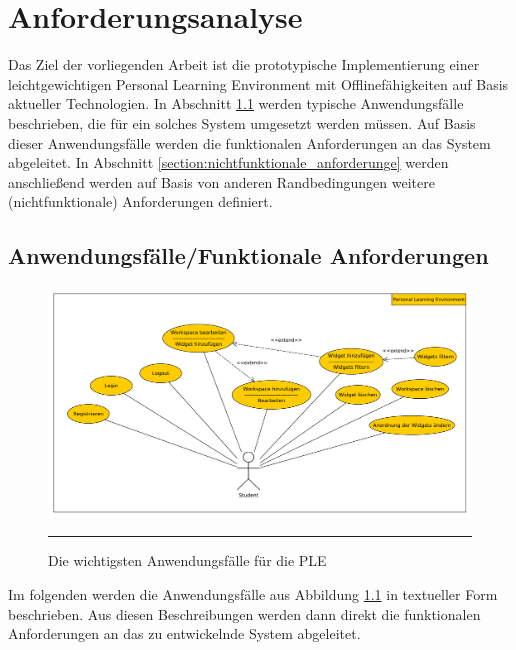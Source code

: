 \chapter{Anforderungsanalyse} 
\label{chapter:Kapitel3}

Das Ziel der vorliegenden Arbeit ist die prototypische Implementierung einer leichtgewichtigen Personal Learning Environment mit Offlinefähigkeiten auf Basis aktueller Technologien. In Abschnitt \ref{section:anwendungsfaelle} werden typische Anwendungsfälle beschrieben, die für ein solches System umgesetzt werden müssen. Auf Basis dieser Anwendungsfälle werden die funktionalen Anforderungen an das System abgeleitet. In Abschnitt \ref{section:nichtfunktionale_anforderunge} werden anschließend werden auf Basis von anderen Randbedingungen weitere (nichtfunktionale) Anforderungen definiert.

\section{Anwendungsfälle/Funktionale Anforderungen}\label{section:anwendungsfaelle}
\begin{figure}[hb]
  \centering
  \includegraphics[width=\textwidth,height=\textheight,keepaspectratio]{./Figures/anwendungsfaelle_quer.pdf}
    \rule{35em}{0.5pt}
  \caption[Anwendungsfälle der PLE]{Die wichtigsten Anwendungsfälle für die PLE}
  \label{fig:anwendungsfaelle}
\end{figure}

Im folgenden werden die Anwendungsfälle aus Abbildung \ref{fig:anwendungsfaelle} in textueller Form beschrieben. Aus diesen Beschreibungen werden dann direkt die funktionalen Anforderungen an das zu entwickelnde System abgeleitet.

